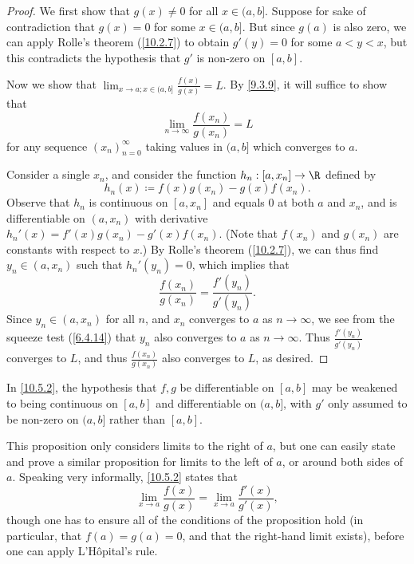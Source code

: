 \begin{proof}
  We first show that \(g(x) \neq 0\) for all \(x \in (a, b]\).
  Suppose for sake of contradiction that \(g(x) = 0\) for some \(x \in (a, b]\).
  But since \(g(a)\) is also zero, we can apply Rolle's theorem (\cref{10.2.7}) to obtain \(g'(y) = 0\) for some \(a < y < x\), but this contradicts the hypothesis that \(g'\) is non-zero on \([a, b]\).

  Now we show that \(\lim_{x \to a ; x \in (a, b]} \frac{f(x)}{g(x)} = L\).
  By \cref{9.3.9}, it will suffice to show that
  \[
    \lim_{n \to \infty} \frac{f(x_n)}{g(x_n)} = L
  \]
  for any sequence \((x_n)_{n = 0}^\infty\) taking values in \((a, b]\) which converges to \(a\).

  Consider a single \(x_n\), and consider the function \(h_n : [a, x_n] \to \R\) defined by
  \[
    h_n(x) \coloneqq f(x) g(x_n) - g(x) f(x_n).
  \]
  Observe that \(h_n\) is continuous on \([a, x_n]\) and equals \(0\) at both \(a\) and \(x_n\), and is differentiable on \((a, x_n)\) with derivative \(h_n'(x) = f'(x) g(x_n) - g'(x) f(x_n)\).
  (Note that \(f(x_n)\) and \(g(x_n)\) are constants with respect to \(x\).)
  By Rolle's theorem (\cref{10.2.7}), we can thus find \(y_n \in (a, x_n)\) such that \(h_n'(y_n) = 0\), which implies that
  \[
    \frac{f(x_n)}{g(x_n)} = \frac{f'(y_n)}{g'(y_n)}.
  \]
  Since \(y_n \in (a, x_n)\) for all \(n\), and \(x_n\) converges to \(a\) as \(n \to \infty\), we see from the squeeze test (\cref{6.4.14}) that \(y_n\) also converges to \(a\) as \(n \to \infty\).
  Thus \(\frac{f'(y_n)}{g'(y_n)}\) converges to \(L\), and thus \(\frac{f(x_n)}{g(x_n)}\) also converges to \(L\), as desired.
\end{proof}

\begin{note}
  In \cref{10.5.2}, the hypothesis that \(f, g\) be differentiable on \([a, b]\) may be weakened to being continuous on \([a, b]\) and differentiable on \((a, b]\), with \(g'\) only assumed to be non-zero on \((a, b]\) rather than \([a, b]\).
\end{note}

\begin{rmk}\label{10.5.3}
  This proposition only considers limits to the right of \(a\), but one can easily state and prove a similar proposition for limits to the left of \(a\), or around both sides of \(a\).
  Speaking very informally, \cref{10.5.2} states that
  \[
    \lim_{x \to a} \frac{f(x)}{g(x)} = \lim_{x \to a} \frac{f'(x)}{g'(x)},
  \]
  though one has to ensure all of the conditions of the proposition hold (in particular, that \(f(a) = g(a) = 0\), and that the right-hand limit exists), before one can apply L'Hôpital's rule.
\end{rmk}

